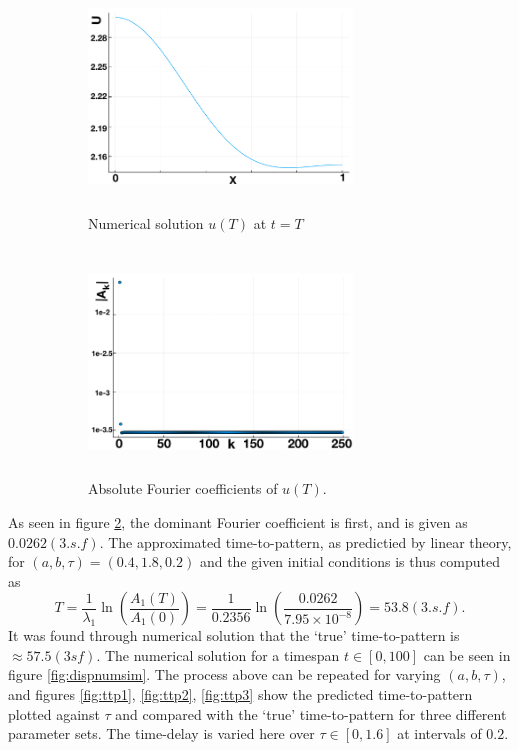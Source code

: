 \begin{figure}[H]
    \centering
    \begin{subfigure}[b]{0.45\textwidth}
        \centering
        \includegraphics[width=7cm,height=6cm]{Tu.png}
        \caption{Numerical solution $u(T)$ at $t=T$}
        \label{uT}
    \end{subfigure}
    \hfill
    \begin{subfigure}[b]{0.45\textwidth}
        \centering
        \includegraphics[width=7cm,height=6cm]{Tfc.png}
        \caption{Absolute Fourier coefficients of $u(T)$.}
        \label{fig:uTfc}
    \end{subfigure}
    \caption{}
    \label{fig:Tfc}
\end{figure}
As seen in figure \ref{fig:uTfc}, the dominant Fourier coefficient is first, and is given as $0.0262(3.s.f)$. The approximated time-to-pattern, as predictied by linear theory, for $(a,b,\tau)=(0.4,1.8,0.2)$ and the given initial conditions is thus computed as
\begin{equation}
    T=\frac{1}{\lambda_1}\ln\left(\frac{A_1(T)}{A_1(0)}\right)=\frac{1}{0.2356}\ln\left(\frac{0.0262}{7.95\times10^{-8}}\right)=53.8(3.s.f).
\end{equation}
It was found through numerical solution that the `true' time-to-pattern is $\approx57.5(3sf)$. The numerical solution for a timespan $t\in[0,100]$ can be seen in figure \ref{fig:dispnumsim}. The process above can be repeated for varying $(a,b,\tau)$, and figures \ref{fig:ttp1}, \ref{fig:ttp2}, \ref{fig:ttp3} show the predicted time-to-pattern plotted against $\tau$ and compared with the `true' time-to-pattern for three different parameter sets. The time-delay is varied here over $\tau\in[0,1.6]$ at intervals of $0.2$.

